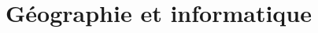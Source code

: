 \overparagraph{}



\subsubsection[]{}
\label{subsub:IV.3.1.2}


\overparagraph{}



\overparagraph{}







\subsection[]{}
\label{sub:IV.3.2}








\section[Géographie et informatique]{Géographie et informatique}
\label{sec:IV.4}


\subsection[]{}
\label{sub:IV.4.1}


\subsubsection[]{}
\label{subsub:IV.4.1.1}

\overparagraph{}



\overparagraph{}




\subsubsection[]{}
\label{subsub:IV.4.1.2}



\overparagraph{}



\overparagraph{}



\overparagraph{}







